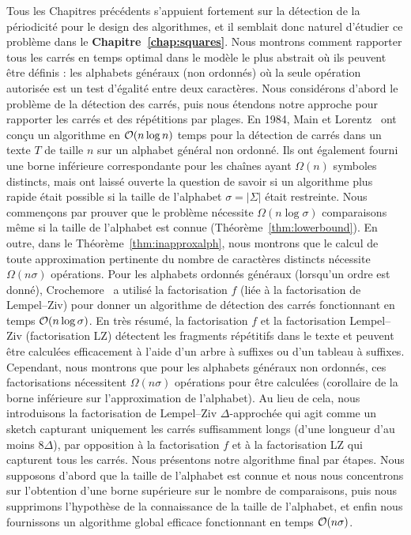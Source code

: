 Tous les Chapitres précédents s'appuient fortement sur la détection de la périodicité pour le design des algorithmes, et il semblait donc naturel d'étudier ce problème dans le \textbf{Chapitre~\ref{chap:squares}}. Nous montrons comment rapporter tous les carrés en temps optimal dans le modèle le plus abstrait où ils peuvent être définis : les alphabets généraux (non ordonnés) où la seule opération autorisée est un test d'égalité entre deux caractères. 
Nous considérons d'abord le problème de la détection des carrés, puis nous étendons notre approche pour rapporter les carrés et des répétitions par plages.
% 
En 1984, Main et Lorentz~\cite{Main1984} ont conçu un algorithme en $\mathcal{O}(n\log n)$ temps pour la détection de carrés dans un texte $T$ de taille $n$ sur un alphabet général non ordonné. Ils ont également fourni une borne inférieure correspondante pour les chaînes ayant $\Omega(n)$ symboles distincts, mais ont laissé ouverte la question de savoir si un algorithme plus rapide était possible si la taille de l'alphabet $\sigma=|\Sigma|$ était restreinte.
% 
Nous commençons par prouver que le problème nécessite $\Omega(n \log \sigma)$ comparaisons même si la taille de l'alphabet est connue (Théorème~\ref{thm:lowerbound}). En outre, dans le Théorème~\ref{thm:inapproxalph}, nous montrons que le calcul de toute approximation pertinente du nombre de caractères distincts nécessite $\Omega(n\sigma)$ opérations.
%
Pour les alphabets ordonnés généraux (lorsqu'un ordre est donné), Crochemore~\cite{Crochemore1986} a utilisé la factorisation $f$ (liée à la factorisation de Lempel--Ziv) pour donner un algorithme de détection des carrés fonctionnant en temps $\mathcal{O}(n\log \sigma)$. En très résumé, la factorisation $f$ et la factorisation Lempel--Ziv (factorisation LZ) détectent les fragments répétitifs dans le texte et peuvent être calculées efficacement à l'aide d'un arbre à suffixes ou d'un tableau à suffixes. Cependant, nous montrons que pour les alphabets généraux non ordonnés, ces factorisations nécessitent $\Omega(n\sigma)$ opérations pour être calculées (corollaire de la borne inférieure sur l'approximation de l'alphabet). 
% 
Au lieu de cela, nous introduisons la factorisation de Lempel--Ziv $\Delta$-approchée qui agit comme un sketch capturant uniquement les carrés suffisamment longs (d'une longueur d'au moins $8\Delta$), par opposition à la factorisation $f$ et à la factorisation LZ qui capturent tous les carrés.
Nous présentons notre algorithme final par étapes. Nous supposons d'abord que la taille de l'alphabet est connue et nous nous concentrons sur l'obtention d'une borne supérieure sur le nombre de comparaisons, puis nous supprimons l'hypothèse de la connaissance de la taille de l'alphabet, et enfin nous fournissons un algorithme global efficace fonctionnant en temps $\mathcal{O}(n\sigma)$.\\



